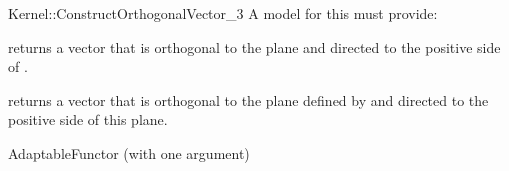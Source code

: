 \begin{ccRefFunctionObjectConcept}{Kernel::ConstructOrthogonalVector_3}
A model for this must provide:


{returns a vector that is orthogonal to the plane  and directed
 to the positive side of .}

{returns a vector that is orthogonal to the plane defined by 
  and directed
 to the positive side of this plane.}

\ccRefines
AdaptableFunctor (with one argument)

\ccSeeAlso
{} \\
\\

\end{ccRefFunctionObjectConcept}
